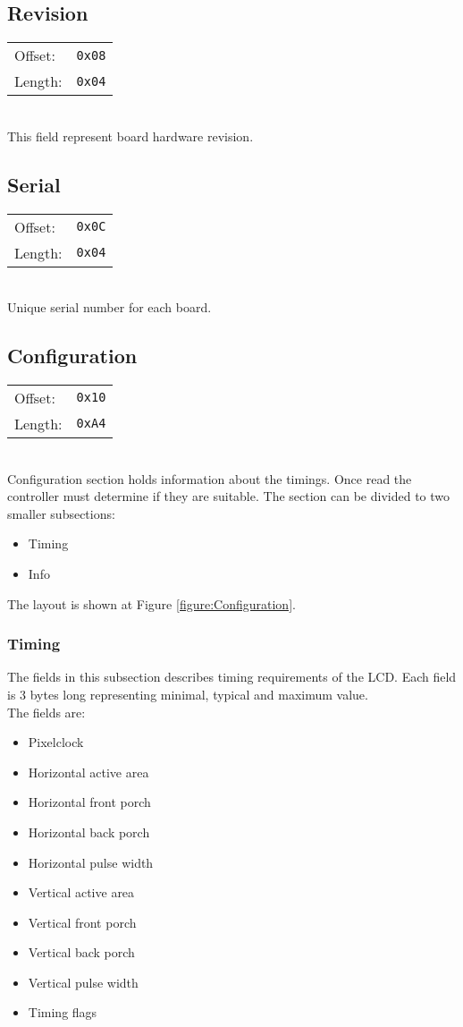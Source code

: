 \documentclass{article}
\newcommand{\regs}[2]{
	\begin{tabular}{l l}
		Offset: & \texttt{#1} \\
		Length: & \texttt{#2}
	\end{tabular} \\
	}
\begin{document}
	\subsection{Revision}
	\regs{0x08}{0x04}

	This field represent board hardware revision.

	\subsection{Serial}
	\regs{0x0C}{0x04}

	Unique serial number for each board.

	\subsection{Configuration}
	\regs{0x10}{0xA4}


	Configuration section holds information about the timings. Once read the controller must
	determine if they are suitable. The section can be divided to two smaller subsections:
	\begin{itemize}
		\item Timing
		\item Info
	\end{itemize}

	The layout is shown at Figure \ref{figure:Configuration}.

		\subsubsection{Timing}
		The fields in this subsection describes timing requirements of the LCD. Each field is 3 bytes long
		representing minimal, typical and maximum value. \\
		The fields are:
		\begin{itemize}
			\item Pixelclock
			\item Horizontal active area
			\item Horizontal front porch
			\item Horizontal back porch
			\item Horizontal pulse width
			\item Vertical active area
			\item Vertical front porch
			\item Vertical back porch
			\item Vertical pulse width
			\item Timing flags
		\end{itemize}
\end{document}
